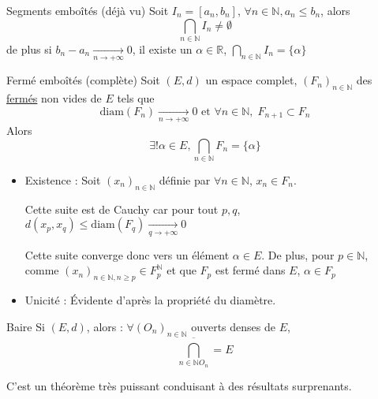 \begin{Theorem}{Segments emboîtés (déjà vu)}{}
  Soit $I_n = [a_n,b_n]$, $\forall n \in \mathbb{N}, a_n \le b_n$, alors 
  \[
    \bigcap _{n \in \mathbb{N}} I_n \ne \emptyset
  \]
  de plus si  $b_n - a_n  \underset{n \to + \infty}{\longrightarrow} 0$, il existe un $\alpha \in \mathbb{R}$, $\bigcap _{n \in \mathbb{N}} I_n = \{ \alpha \}$
\end{Theorem}


\begin{Theorem}{Fermé emboîtés (complète)}{}
  Soit $(E, d)$ un espace complet, $(F_n) _{n\in \mathbb{N}}$ des \underline{fermés} non vides de $E$ tels que 
\[
  \mathrm{diam}(F_n)  \underset{n \to + \infty}{\longrightarrow}  0 \text{ et } \forall n \in \mathbb{N},\; F _{n+1} \subset F_n
\]
Alors 
\[
  \exists ! \alpha \in E, \bigcap _{n \in \mathbb{N}} F_n = \{ \alpha\}
\]
\end{Theorem}

\begin{myproof}{}{}
\begin{itemize}

    \item Existence : 
Soit $(x_n) _{n \in \mathbb{N}}$ définie par $\forall n \in \mathbb{N}$, $x_n \in F_n$. 

Cette suite est de Cauchy car pour tout $p, q$, $d(x_p,x_q) \le \mathrm{diam}(F_q)  \underset{q \to + \infty}{\longrightarrow} 0$

Cette suite converge donc vers un élément $\alpha \in E$. De plus, pour $p \in \mathbb{N}$, comme $(x_n) _{n \in \mathbb{N}, n \ge p } \in F_p ^{\mathbb{N}}$ et que $F_p$ est fermé dans $E$, $\alpha \in F_p$

\item Unicité : Évidente d'après la propriété du diamètre.

\end{itemize}
\end{myproof}



\begin{Theorem}{Baire}{}
Si $(E,d)$, alors : $\forall (O_n) _{n \in \mathbb{N}}$ ouverts denses de $E$, $$\overline{ \bigcap _{n \in \mathbb{N} O_n}} = E$$
\end{Theorem}

C'est un théorème très puissant conduisant à des résultats surprenants.


